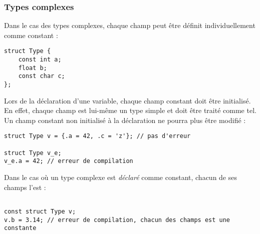 \documentclass[../../../main.tex]{subfiles}
\begin{document}
\subsubsection{Types complexes}
\label{ssub:types_complexes}
Dans le cas des types complexes, chaque champ peut être définit individuellement comme constant :
\begin{verbatim}
struct Type {
	const int a;
	float b;
	const char c;	
};
\end{verbatim}
Lors de la déclaration d'une variable, chaque champ constant doit être initialisé. En effet, chaque champ est lui-même un type simple et doit être traité comme tel. Un champ constant non initialisé à la déclaration ne pourra plus être modifié :
\begin{verbatim}
struct Type v = {.a = 42, .c = 'z'}; // pas d'erreur

struct Type v_e;
v_e.a = 42; // erreur de compilation
\end{verbatim}
Dans le cas où un type complexe est \textit{déclaré} comme constant, chacun de ses champs l'est :
\begin{verbatim}

const struct Type v;
v.b = 3.14; // erreur de compilation, chacun des champs est une constante
\end{verbatim}
\end{document}
